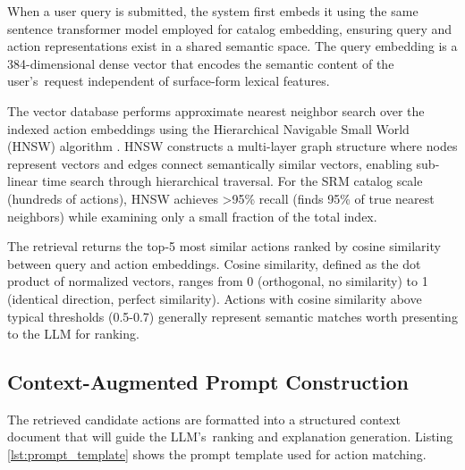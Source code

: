When a user query is submitted, the system first embeds it using the same sentence transformer model employed for catalog embedding, ensuring query and action representations exist in a shared semantic space. The query embedding is a 384-dimensional dense vector that encodes the semantic content of the user's~request independent of surface-form lexical features.

The vector database performs approximate nearest neighbor search over the indexed action embeddings using the Hierarchical Navigable Small World (HNSW) algorithm \cite{malkov2018efficientrobustapproximatenearest}. HNSW constructs a multi-layer graph structure where nodes represent vectors and edges connect semantically similar vectors, enabling sub-linear time search through hierarchical traversal. For the SRM catalog scale (hundreds of actions), HNSW achieves >95\% recall (finds 95\% of true nearest neighbors) while examining only a small fraction of the total index.

The retrieval returns the top-5 most similar actions ranked by cosine similarity between query and action embeddings. Cosine similarity, defined as the dot product of normalized vectors, ranges from 0 (orthogonal, no similarity) to 1 (identical direction, perfect similarity). Actions with cosine similarity above typical thresholds (0.5-0.7) generally represent semantic matches worth presenting to the LLM for ranking.

\subsection{Context-Augmented Prompt Construction}

The retrieved candidate actions are formatted into a structured context document that will guide the LLM's~ranking and explanation generation. Listing \ref{lst:prompt_template} shows the prompt template used for action matching.

